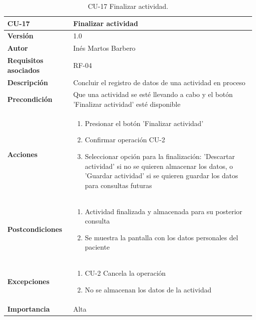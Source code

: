 \begin{table}[p]
	\centering
	\begin{tabularx}{\linewidth}{ p{} p{} }
		\toprule
		\textbf{CU-17}    & \textbf{Finalizar actividad}\\
		\toprule
		\textbf{Versión}              & 1.0    \\
		\textbf{Autor}                & Inés Martos Barbero \\
		\textbf{Requisitos asociados} & RF-04 \\
		\textbf{Descripción}          & Concluir el registro de datos de una actividad en proceso \\
		\textbf{Precondición}         & Que una actividad se esté llevando a cabo y el botón 'Finalizar actividad' esté disponible \\
		\textbf{Acciones}             &
		\begin{enumerate}
			\def\labelenumi{\arabic{enumi}.}
			\tightlist
			\item Presionar el botón 'Finalizar actividad'
			\item Confirmar operación CU-2
            \item Seleccionar opción para la finalización: 'Descartar actividad' si no se quieren almacenar los datos, o 'Guardar actividad' si se quieren guardar los datos para consultas futuras
		\end{enumerate}\\
		\textbf{Postcondiciones}        & 
        \begin{enumerate}
			\def\labelenumi{\arabic{enumi}.}
			\tightlist
			\item Actividad finalizada y almacenada para su posterior consulta
			\item Se muestra la pantalla con los datos personales del paciente
		\end{enumerate}\\
		\textbf{Excepciones}          & 
        \begin{enumerate}
			\def\labelenumi{\arabic{enumi}.}
			\tightlist
			\item CU-2 Cancela la operación
			\item No se almacenan los datos de la actividad
		\end{enumerate}\\
		\textbf{Importancia}          & Alta  \\
		\bottomrule
	\end{tabularx}
	\caption{CU-17 Finalizar actividad.}
\end{table}

